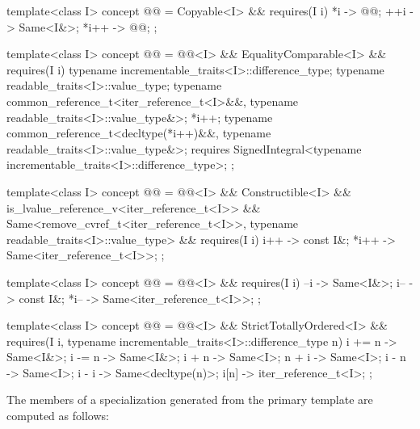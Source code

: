 \begin{codeblock}
template<class I>
concept @@ =
  Copyable<I> && requires(I i) {
    {   *i } -> @@;
    {  ++i } -> Same<I&>;
    { *i++ } -> @@;
  };

template<class I>
concept @@ =
  @@<I> && EqualityComparable<I> && requires(I i) {
    typename incrementable_traits<I>::difference_type;
    typename readable_traits<I>::value_type;
    typename common_reference_t<iter_reference_t<I>&&,
                                typename readable_traits<I>::value_type&>;
    *i++;
    typename common_reference_t<decltype(*i++)&&,
                                typename readable_traits<I>::value_type&>;
    requires SignedIntegral<typename incrementable_traits<I>::difference_type>;
  };

template<class I>
concept @@ =
  @@<I> && Constructible<I> &&
  is_lvalue_reference_v<iter_reference_t<I>> &&
  Same<remove_cvref_t<iter_reference_t<I>>, typename readable_traits<I>::value_type> &&
  requires(I i) {
    {  i++ } -> const I&;
    { *i++ } -> Same<iter_reference_t<I>>;
  };

template<class I>
concept @@ =
  @@<I> && requires(I i) {
    {  --i } -> Same<I&>;
    {  i-- } -> const I&;
    { *i-- } -> Same<iter_reference_t<I>>;
  };

template<class I>
concept @@ =
  @@<I> && StrictTotallyOrdered<I> &&
  requires(I i, typename incrementable_traits<I>::difference_type n) {
    { i += n } -> Same<I&>;
    { i -= n } -> Same<I&>;
    { i +  n } -> Same<I>;
    { n +  i } -> Same<I>;
    { i -  n } -> Same<I>;
    { i -  i } -> Same<decltype(n)>;
    {  i[n]  } -> iter_reference_t<I>;
  };
\end{codeblock}

\pnum
The members of a specialization  generated from the
 primary template are computed as follows:

